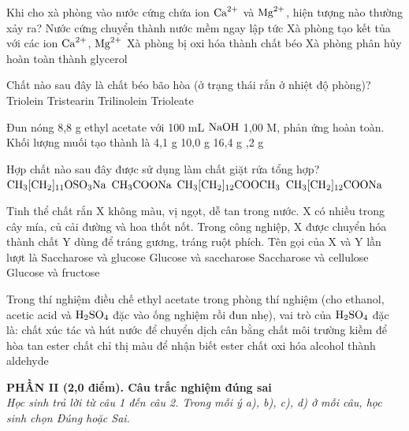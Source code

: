\documentclass[11pt,a4paper]{article}
\begin{document}
\begin{ex}
Khi cho xà phòng vào nước cứng chứa ion $\ce{Ca^2+}$ và $\ce{Mg^2+}$, hiện tượng nào thường xảy ra?
\choice
{Nước cứng chuyển thành nước mềm ngay lập tức}
{\True Xà phòng tạo kết tủa với các ion $\ce{Ca^2+}$, $\ce{Mg^2+}$}
{Xà phòng bị oxi hóa thành chất béo}
{Xà phòng phân hủy hoàn toàn thành glycerol}

\end{ex}

\begin{ex}
Chất nào sau đây là chất béo bão hòa (ở trạng thái rắn ở nhiệt độ phòng)?
\choice
{Triolein}
{\True Tristearin}
{Trilinolein}
{Trioleate}

\end{ex}

\begin{ex}
Đun nóng 8,8 g ethyl acetate với 100 mL $\ce{NaOH}$ 1,00 M, phản ứng hoàn toàn. Khối lượng muối tạo thành là
\choice
{4,1 g}
{10,0 g}
{16,4 g}
{,2 g}

\end{ex}

\begin{ex}
Hợp chất nào sau đây được sử dụng làm chất giặt rửa tổng hợp?
\choice
{\True $\ce{CH3[CH2]11OSO3Na}$}
{$\ce{CH3COONa}$}
{$\ce{CH3[CH2]12COOCH3}$}
{$\ce{CH3[CH2]12COONa}$}

\end{ex}

\begin{ex}
Tinh thể chất rắn X không màu, vị ngọt, dễ tan trong nước. X có nhiều trong cây mía, củ cải đường và hoa thốt nốt. Trong công nghiệp, X được chuyển hóa thành chất Y dùng để tráng gương, tráng ruột phích. Tên gọi của X và Y lần lượt là
\choice
{\True Saccharose và glucose}
{Glucose và saccharose}
{Saccharose và cellulose}
{Glucose và fructose}

\end{ex}

\begin{ex}
Trong thí nghiệm điều chế ethyl acetate trong phòng thí nghiệm (cho ethanol, acetic acid và $\ce{H2SO4}$ đặc vào ống nghiệm rồi đun nhẹ), vai trò của $\ce{H2SO4}$ đặc là:
\choice
{\True chất xúc tác và hút nước để chuyển dịch cân bằng}
{chất môi trường kiềm để hòa tan ester}
{chất chỉ thị màu để nhận biết ester}
{chất oxi hóa alcohol thành aldehyde}

\end{ex}

\vspace{4pt}
\noindent
{\color{mainGreen}\textbf{\large PHẦN II (2,0 điểm). Câu trắc nghiệm đúng sai}}\\
\textit{\small Học sinh trả lời từ câu 1 đến câu 2. Trong mỗi ý a), b), c), d) ở mỗi câu, học sinh chọn Đúng hoặc Sai.}
\vspace{2pt}
\end{document}
